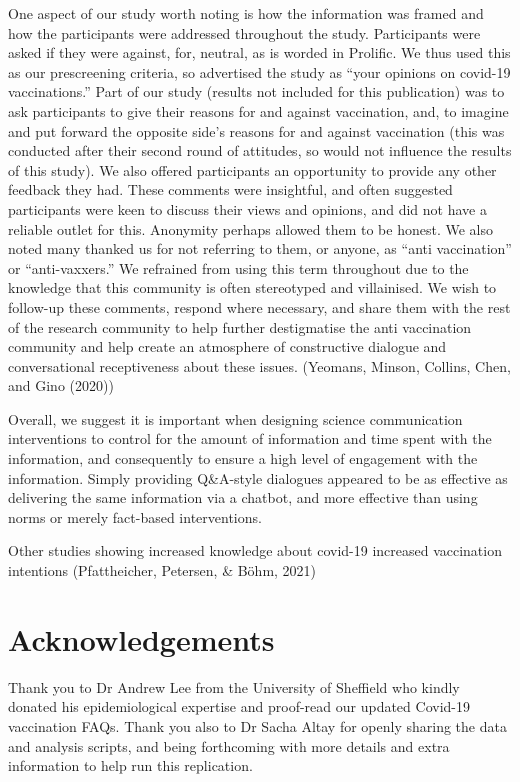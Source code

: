 \documentclass[english,,jou,floatsintext]{apa6}
\begin{document}
One aspect of our study worth noting is how the information was framed and how the participants were addressed throughout the study. Participants were asked if they were against, for, neutral, as is worded in Prolific. We thus used this as our prescreening criteria, so advertised the study as \enquote{your opinions on covid-19 vaccinations.} Part of our study (results not included for this publication) was to ask participants to give their reasons for and against vaccination, and, to imagine and put forward the opposite side's reasons for and against vaccination (this was conducted after their second round of attitudes, so would not influence the results of this study). We also offered participants an opportunity to provide any other feedback they had. These comments were insightful, and often suggested participants were keen to discuss their views and opinions, and did not have a reliable outlet for this. Anonymity perhaps allowed them to be honest. We also noted many thanked us for not referring to them, or anyone, as \enquote{anti vaccination} or \enquote{anti-vaxxers.} We refrained from using this term throughout due to the knowledge that this community is often stereotyped and villainised. We wish to follow-up these comments, respond where necessary, and share them with the rest of the research community to help further destigmatise the anti vaccination community and help create an atmosphere of constructive dialogue and conversational receptiveness about these issues. (Yeomans, Minson, Collins, Chen, and Gino (2020))

Overall, we suggest it is important when designing science communication interventions to control for the amount of information and time spent with the information, and consequently to ensure a high level of engagement with the information. Simply providing Q\&A-style dialogues appeared to be as effective as delivering the same information via a chatbot, and more effective than using norms or merely fact-based interventions.

Other studies showing increased knowledge about covid-19 increased vaccination intentions (Pfattheicher, Petersen, \& Böhm, 2021)

\hypertarget{acknowledgements}{%
\section{Acknowledgements}\label{acknowledgements}}

Thank you to Dr Andrew Lee from the University of Sheffield who kindly donated his epidemiological expertise and proof-read our updated Covid-19 vaccination FAQs.
Thank you also to Dr Sacha Altay for openly sharing the data and analysis scripts, and being forthcoming with more details and extra information to help run this replication.
\end{document}
